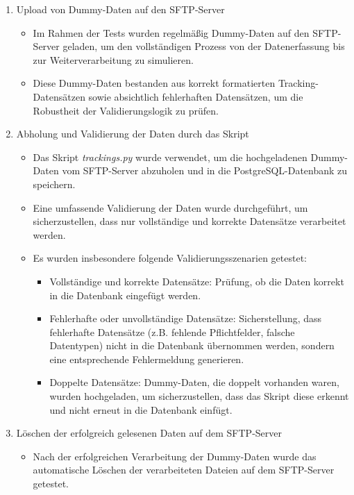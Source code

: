 \begin{enumerate}
    \item Upload von Dummy-Daten auf den SFTP-Server
    \begin{itemize}
        \item Im Rahmen der Tests wurden regelmäßig Dummy-Daten auf den SFTP-Server geladen, um den vollständigen Prozess von der Datenerfassung bis zur Weiterverarbeitung zu simulieren.
        \item Diese Dummy-Daten bestanden aus korrekt formatierten Tracking-Datensätzen sowie absichtlich fehlerhaften Datensätzen, um die Robustheit der Validierungslogik zu prüfen.
    \end{itemize}
    \item Abholung und Validierung der Daten durch das Skript
    \begin{itemize}
        \item Das Skript \textit{trackings.py} wurde verwendet, um die hochgeladenen Dummy-Daten vom SFTP-Server abzuholen und in die PostgreSQL-Datenbank zu speichern.
        \item Eine umfassende Validierung der Daten wurde durchgeführt, um sicherzustellen, dass nur vollständige und korrekte Datensätze verarbeitet werden.
        \item Es wurden insbesondere folgende Validierungsszenarien getestet:
        \begin{itemize}
            \item Vollständige und korrekte Datensätze: Prüfung, ob die Daten korrekt in die Datenbank eingefügt werden.
            \item Fehlerhafte oder unvollständige Datensätze: Sicherstellung, dass fehlerhafte Datensätze (z.B. fehlende Pflichtfelder, falsche Datentypen) nicht in die Datenbank übernommen werden, sondern eine entsprechende Fehlermeldung generieren.
            \item Doppelte Datensätze: Dummy-Daten, die doppelt vorhanden waren, wurden hochgeladen, um sicherzustellen, dass das Skript diese erkennt und nicht erneut in die Datenbank einfügt.
        \end{itemize}
    \end{itemize}
    \item Löschen der erfolgreich gelesenen Daten auf dem SFTP-Server
    \begin{itemize}
        \item Nach der erfolgreichen Verarbeitung der Dummy-Daten wurde das automatische Löschen der verarbeiteten Dateien auf dem SFTP-Server getestet.

\end{itemize}
\end{enumerate}
